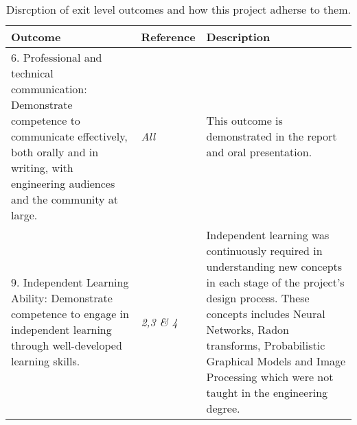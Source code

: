 \begin{table}
\caption{Disrcption of exit level outcomes and how this project adherse to them.} \label{tbl:ECSATable2}
\begin{tabular}{|p{6cm}|p{3cm}|p{6cm}|}
\hline
\textbf{Outcome}&\textbf{Reference}&\textbf{Description}\\
\hline
6. Professional and technical communication: Demonstrate competence to communicate effectively, both orally and
in writing, with engineering audiences and the community at large.&\textit{All}&This outcome is demonstrated in the report and oral presentation.\\
\hline
9. Independent Learning Ability: Demonstrate competence to engage in independent learning through well-developed
learning skills.&\textit{2,3 \& 4}&Independent learning was continuously required in understanding new concepts in each stage of the project's design process. These concepts includes Neural Networks, Radon transforms, Probabilistic Graphical Models and Image Processing which were not taught in the engineering degree.\\
\hline
\end{tabular}
\end{table}
